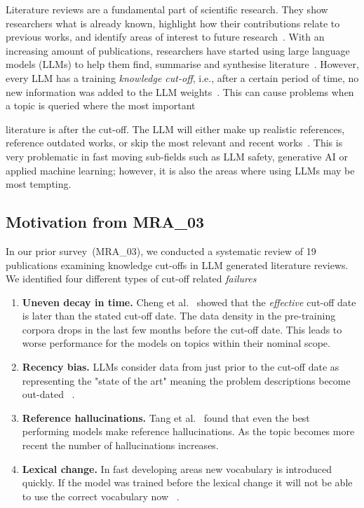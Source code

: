 \documentclass[conference]{IEEEtran}
\begin{document}
Literature reviews are a fundamental part of scientific research. They show
researchers what is already known, highlight how their contributions
relate to previous works, and identify areas of interest to future
research~\cite{tang2025}. With an increasing amount of publications, researchers
have started using large language models (LLMs) to help them find,
summarise and synthesise literature~\cite{gao2024rag}. However, every LLM has a
training \emph{knowledge cut-off}, i.e., after a certain period of time,
no new information was added to the LLM weights~\cite{cheng2024}.
This can cause problems when a topic is queried where the most important

literature is after the cut-off. The LLM will either make up realistic
references, reference outdated works, or skip the most relevant and recent
works~\cite{walters2023,scherbakov2025}.
This is very problematic in fast moving sub-fields such as LLM safety,
generative AI or applied machine learning; however, it is also the areas
where using LLMs may be most tempting.

\subsection{Motivation from MRA\_03}

In our prior survey~(MRA\_03), we conducted a systematic review of 19
publications examining knowledge cut-offs in LLM generated literature
reviews. We identified four different types of cut-off related
\emph{failures}

\begin{enumerate}[leftmargin=*,topsep=2pt]
  \item \textbf{Uneven decay in time.} Cheng et al.~\cite{cheng2024}
showed that the \emph{effective} cut-off date is later than the stated
cut-off date. The data density in the pre-training corpora drops in the last few months before the
cut-off date. This leads to worse performance for the models on topics within their nominal scope.
\item \textbf{Recency bias.} LLMs consider data from just prior to the
cut-off date as representing the "state of the art" meaning the problem descriptions become out-dated
~\cite{gao2025}.
\item \textbf{Reference hallucinations.} Tang et al.~\cite{tang2025}
found that even the best performing models make reference hallucinations. As the topic becomes more
recent the number of hallucinations increases.
\item \textbf{Lexical change.} In fast developing areas new vocabulary is
introduced quickly. If the model was trained before the lexical change it will not be able to use the
correct vocabulary now ~\cite{kasanishi2023}.
\end{enumerate}
\end{document}

